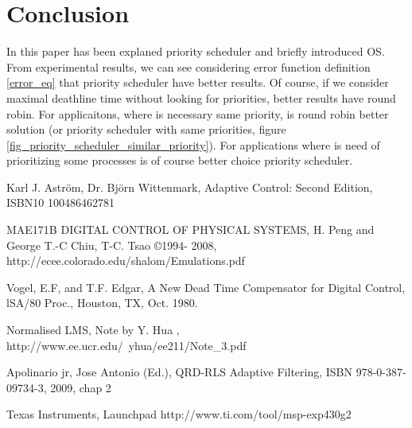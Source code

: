 \documentclass[conference]{IEEEtran}
\begin{document}
\section{Conclusion}
In this paper has been explaned priority scheduler and briefly introduced OS. From experimental results, we can see considering error function definition \ref{error_eq} that priority scheduler have better results. Of course, if we consider maximal deathline time without looking for priorities, better results have round robin. For applicaitons, where is necessary same priority, is round robin better solution (or priority scheduler with same priorities, figure \ref{fig_priority_scheduler_similar_priority}). For applications where is need of prioritizing some processes is of course better choice priority scheduler.



\balance

 
\begin{thebibliography}{99}

Karl J. Astr{\"{o}}m, Dr. Bj{\"{o}}rn Wittenmark, Adaptive Control: Second Edition, ISBN10 100486462781

MAE171B DIGITAL CONTROL OF PHYSICAL SYSTEMS, H. Peng and George T.-C Chiu, T-C. Tsao ©1994- 2008, http://ecee.colorado.edu/shalom/Emulations.pdf

Vogel, E.F, and T.F. Edgar, A New Dead Time Compensator for Digital Control, lSA/80 Proc., Houston, TX, Oct. 1980.

Normalised LMS, Note by Y. Hua , http://www.ee.ucr.edu/~yhua/ee211/Note\_3.pdf

Apolinario jr, Jose Antonio (Ed.),  QRD-RLS Adaptive Filtering, ISBN 978-0-387-09734-3, 2009, chap 2

Texas Instruments, Launchpad http://www.ti.com/tool/msp-exp430g2
\end{thebibliography}
\end{document}
